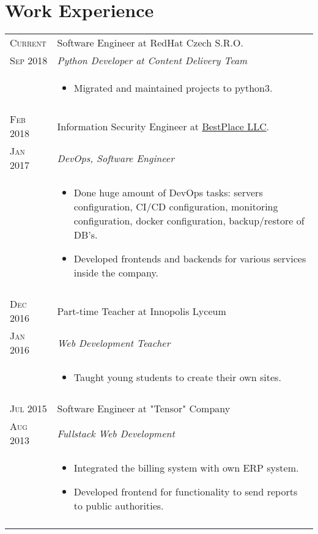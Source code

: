 \documentclass[a4paper,10pt]{article}
\begin{document}
\section{Work Experience}
\begin{tabular}{R{2cm}|L{15cm}}
	\textsc{Current}  & Software Engineer at RedHat Czech S.R.O.                                     \\\textsc{Sep 2018}&\emph{Python Developer at Content Delivery Team}\\&\footnotesize{
	\begin{itemize}
	\item Migrated and maintained projects to python3.
	\end{itemize}
	}\\\\
	\textsc{Feb 2018} & Information Security Engineer at \href{https://bestplace.ai}{BestPlace LLC}. \\\textsc{Jan 2017}&\emph{DevOps, Software Engineer}\\&\footnotesize{
	\begin{itemize}
	\item Done huge amount of DevOps tasks: servers configuration, CI/CD configuration, monitoring configuration, docker configuration, backup/restore of DB's.
	\item Developed frontends and backends for various services inside the company.
	\end{itemize}
	}\\ \\
	\textsc{Dec 2016} & Part-time Teacher at Innopolis Lyceum                                        \\\textsc{Jan 2016}&\emph{Web Development Teacher}\\&\footnotesize{
	\begin{itemize}
	\item Taught young students to create their own sites.
	\end{itemize}
	}\\\\
	\textsc{Jul 2015} & Software Engineer at "Tensor" Company                                        \\\textsc{Aug 2013}&\emph{Fullstack Web Development}\\&
	\footnotesize{
	\begin{itemize}
	\item Integrated the billing system with own ERP system.
	\item Developed frontend for functionality to send reports to public authorities.
	\end{itemize}
	}\\
	 \\
\end{tabular}
\end{document}
